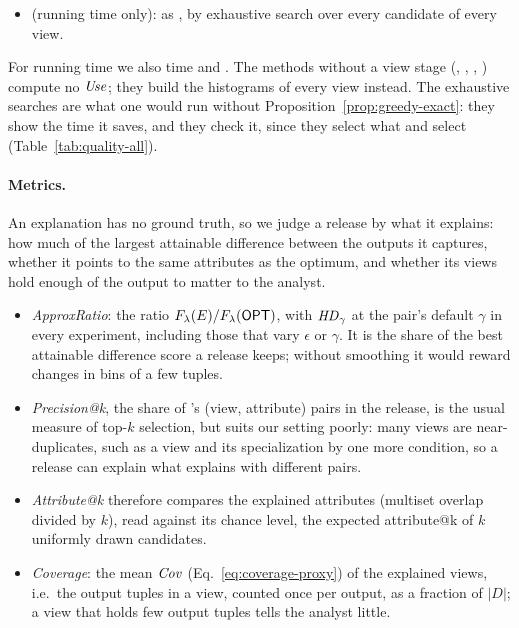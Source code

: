 {\begin{itemize}[leftmargin=*,itemsep=1pt,topsep=2pt]
  \item \FullExh{} (running time only): as \TopKExh{}, by exhaustive search over every candidate of every view.
\end{itemize}
For running time we also time \BF{} and \SingleStage{}. The methods without a view stage (\BF{}, \SingleStage{}, \TopKExh{}, \FullExh{}) compute no $\mathit{Use}$; they build the histograms of every view instead. The exhaustive searches are what one would run without Proposition~\ref{prop:greedy-exact}: they show the time it saves, and they check it, since they select what \Bone{} and \BF{} select (Table~\ref{tab:quality-all}).\par}

\paragraph{Metrics.}
An explanation has no ground truth, so we judge a release by what it explains: how much of the largest attainable difference between the outputs it captures, whether it points to the same attributes as the optimum, and whether its views hold enough of the output to matter to the analyst.
\begin{itemize}[leftmargin=*,itemsep=1pt,topsep=2pt]
  \item \emph{ApproxRatio}: the ratio $F_\lambda(E)/F_\lambda(\textsf{OPT}{})$, with $\mathit{HD}_\gamma$ at the pair's default $\gamma$ in every experiment, including those that vary $\epsilon$ or $\gamma$. It is the share of the best attainable difference score a release keeps; without smoothing it would reward changes in bins of a few tuples.
  \item \emph{Precision@k}, the share of \BF{}'s (view, attribute) pairs in the release, is the usual measure of top-$k$ selection, but suits our setting poorly: many views are near-duplicates, such as a view and its specialization by one more condition, so a release can explain what \BF{} explains with different pairs.
  \item \emph{Attribute@k} therefore compares the explained attributes (multiset overlap divided by $k$), read against its chance level, the expected attribute@k of $k$ uniformly drawn candidates.
  \item \emph{Coverage}: the mean $\mathit{Cov}$ (Eq.~\eqref{eq:coverage-proxy}) of the explained views, i.e.\ the output tuples in a view, counted once per output, as a fraction of $|D|$; a view that holds few output tuples tells the analyst little.
\end{itemize}

